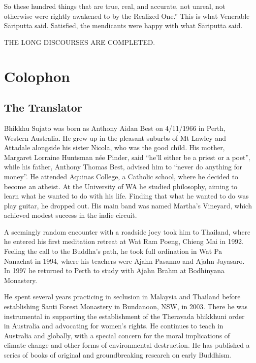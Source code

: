 \documentclass[12pt,openany]{book}%
\newcommand*{\scendbook}[1]{\begin{center}\uppercase{#1}\end{center}}
\let\oldbackmatter\backmatter
\renewcommand{\backmatter}{%
\chapterfont{\setstretch{.85}\normalfont\centering}%
\sectionfont{\setstretch{.85}\Semiboldsubheadfont}%
\oldbackmatter}
\begin{document}
So these hundred things that are true, real, and accurate, not unreal, not otherwise were rightly awakened to by the Realized One.” This is what Venerable \textsanskrit{Sāriputta} said. Satisfied, the mendicants were happy with what \textsanskrit{Sāriputta} said. 

\scendbook{The Long Discourses are completed. }

%
\backmatter%
\chapter*{Colophon}

\section*{The Translator}

Bhikkhu Sujato was born as Anthony Aidan Best on 4/11/1966 in Perth, Western Australia. He grew up in the pleasant suburbs of Mt Lawley and Attadale alongside his sister Nicola, who was the good child. His mother, Margaret Lorraine Huntsman née Pinder, said “he’ll either be a priest or a poet”, while his father, Anthony Thomas Best, advised him to “never do anything for money”. He attended Aquinas College, a Catholic school, where he decided to become an atheist. At the University of WA he studied philosophy, aiming to learn what he wanted to do with his life. Finding that what he wanted to do was play guitar, he dropped out. His main band was named Martha’s Vineyard, which achieved modest success in the indie circuit. 

A seemingly random encounter with a roadside joey took him to Thailand, where he entered his first meditation retreat at Wat Ram Poeng, Chieng Mai in 1992. Feeling the call to the Buddha’s path, he took full ordination in Wat Pa Nanachat in 1994, where his teachers were Ajahn Pasanno and Ajahn Jayasaro. In 1997 he returned to Perth to study with Ajahn Brahm at Bodhinyana Monastery. 

He spent several years practicing in seclusion in Malaysia and Thailand before establishing Santi Forest Monastery in Bundanoon, NSW, in 2003. There he was instrumental in supporting the establishment of the Theravada bhikkhuni order in Australia and advocating for women’s rights. He continues to teach in Australia and globally, with a special concern for the moral implications of climate change and other forms of environmental destruction. He has published a series of books of original and groundbreaking research on early Buddhism. 
\end{document}
